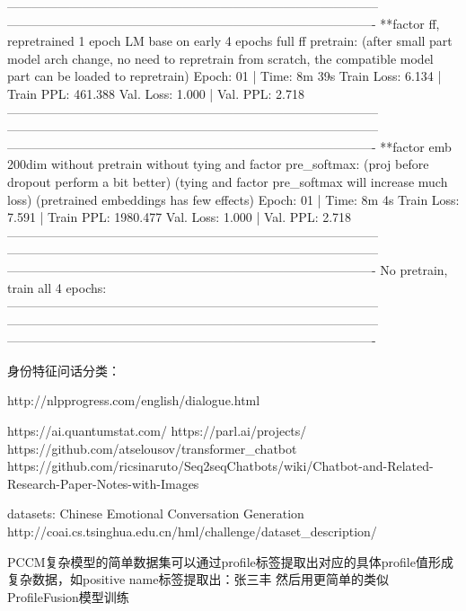 \documentclass[letterpaper]{article} %
\begin{document}
\begin{CJK*}{UTF8}{gbsn}
-----------------------------------------------------------------------------------------
----------------------------------------------------------------------------------------
**factor ff, repretrained 1 epoch LM base on early 4 epochs full ff pretrain:
(after small part model arch change, no need to repretrain from scratch,
the compatible model part can be loaded to repretrain)
Epoch: 01 | Time: 8m 39s
	Train Loss: 6.134 | Train PPL: 461.388
	 Val. Loss: 1.000 |  Val. PPL:   2.718
-----------------------------------------------------------------------------------------
-----------------------------------------------------------------------------------------
----------------------------------------------------------------------------------------
**factor emb 200dim without pretrain without tying and factor pre_softmax:
(proj before dropout perform a bit better)
(tying and factor pre_softmax will increase much loss)
(pretrained embeddings has few effects)
Epoch: 01 | Time: 8m 4s
	Train Loss: 7.591 | Train PPL: 1980.477
	 Val. Loss: 1.000 |  Val. PPL:   2.718
-----------------------------------------------------------------------------------------
-----------------------------------------------------------------------------------------
----------------------------------------------------------------------------------------
No pretrain, train all 4 epochs:
-----------------------------------------------------------------------------------------
-----------------------------------------------------------------------------------------
----------------------------------------------------------------------------------------



身份特征问话分类：


http://nlpprogress.com/english/dialogue.html

https://ai.quantumstat.com/
https://parl.ai/projects/
https://github.com/atselousov/transformer\_chatbot
https://github.com/ricsinaruto/Seq2seqChatbots/wiki/Chatbot-and-Related-Research-Paper-Notes-with-Images


datasets:
Chinese Emotional Conversation Generation
http://coai.cs.tsinghua.edu.cn/hml/challenge/dataset\_description/


PCCM复杂模型的简单数据集可以通过profile标签提取出对应的具体profile值形成复杂数据，如positive name标签提取出：张三丰
然后用更简单的类似ProfileFusion模型训练

\clearpage\end{CJK*}
\end{document}

